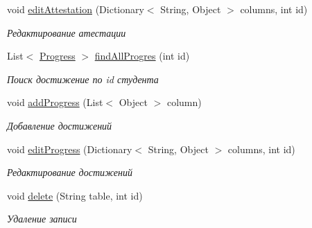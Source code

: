 \begin{DoxyCompactItemize}
void \mbox{\hyperlink{classpatterns_kursach_1_1data_mapper_1_1_student_mapper_aa0c568803d00abb2b828eb9a607559f0}{edit\+Attestation}} (Dictionary$<$ String, Object $>$ columns, int id)
\begin{DoxyCompactList}\small\item\em Редактирование атестации \end{DoxyCompactList}\item 
List$<$ \mbox{\hyperlink{classpatterns_kursach_1_1_progress}{Progress}} $>$ \mbox{\hyperlink{classpatterns_kursach_1_1data_mapper_1_1_student_mapper_af34ea0889dac84d4d6d4734e75f5afde}{find\+All\+Progres}} (int id)
\begin{DoxyCompactList}\small\item\em Поиск достижение по id студента \end{DoxyCompactList}\item 
void \mbox{\hyperlink{classpatterns_kursach_1_1data_mapper_1_1_student_mapper_afc4296ea69198048d65524e961405257}{add\+Progress}} (List$<$ Object $>$ column)
\begin{DoxyCompactList}\small\item\em Добавление достижений \end{DoxyCompactList}\item 
void \mbox{\hyperlink{classpatterns_kursach_1_1data_mapper_1_1_student_mapper_aa56f41da7703e461b7036af897af0e08}{edit\+Progress}} (Dictionary$<$ String, Object $>$ columns, int id)
\begin{DoxyCompactList}\small\item\em Редактирование достижений \end{DoxyCompactList}\item 
void \mbox{\hyperlink{classpatterns_kursach_1_1data_mapper_1_1_student_mapper_a6cd695afde7db19cd289b3fdd44a52da}{delete}} (String table, int id)
\begin{DoxyCompactList}\small\item\em Удаление записи \end{DoxyCompactList}\end{DoxyCompactItemize}
